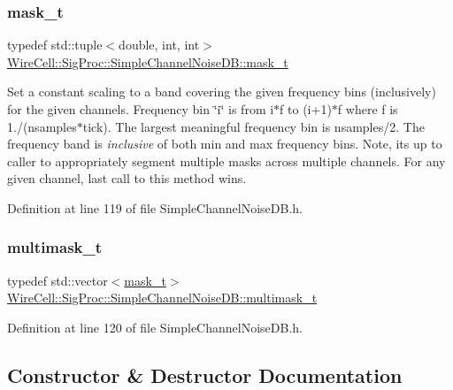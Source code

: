 \subsubsection{\texorpdfstring{mask\+\_\+t}{mask\_t}}
{\footnotesize\ttfamily typedef std\+::tuple$<$double, int, int$>$ \hyperlink{class_wire_cell_1_1_sig_proc_1_1_simple_channel_noise_d_b_a4b7e8bae65910a6667ee80bfde4cc77d}{Wire\+Cell\+::\+Sig\+Proc\+::\+Simple\+Channel\+Noise\+D\+B\+::mask\+\_\+t}}

Set a constant scaling to a band covering the given frequency bins (inclusively) for the given channels. Frequency bin \char`\"{}i\char`\"{} is from i$\ast$f to (i+1)$\ast$f where f is 1./(nsamples$\ast$tick). The largest meaningful frequency bin is nsamples/2. The frequency band is {\itshape inclusive} of both min and max frequency bins. Note, it\textquotesingle{}s up to caller to appropriately segment multiple masks across multiple channels. For any given channel, last call to this method wins. 

Definition at line 119 of file Simple\+Channel\+Noise\+D\+B.\+h.

\mbox{\label{class_wire_cell_1_1_sig_proc_1_1_simple_channel_noise_d_b_ac88af8d617681e36c68c5f1899452d01}} 
\subsubsection{\texorpdfstring{multimask\+\_\+t}{multimask\_t}}
{\footnotesize\ttfamily typedef std\+::vector$<$\hyperlink{class_wire_cell_1_1_sig_proc_1_1_simple_channel_noise_d_b_a4b7e8bae65910a6667ee80bfde4cc77d}{mask\+\_\+t}$>$ \hyperlink{class_wire_cell_1_1_sig_proc_1_1_simple_channel_noise_d_b_ac88af8d617681e36c68c5f1899452d01}{Wire\+Cell\+::\+Sig\+Proc\+::\+Simple\+Channel\+Noise\+D\+B\+::multimask\+\_\+t}}



Definition at line 120 of file Simple\+Channel\+Noise\+D\+B.\+h.



\subsection{Constructor \& Destructor Documentation}
\mbox{\label{class_wire_cell_1_1_sig_proc_1_1_simple_channel_noise_d_b_af86bbcf1a79a98850b9ca24a0e9bd2e3}} 
